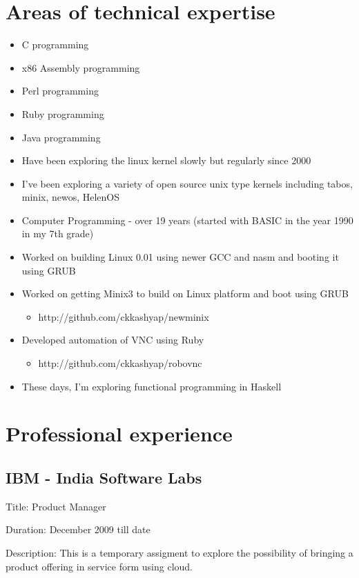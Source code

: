 \documentclass [a4paper,11pt] {article}
\begin{document}
\section*{Areas of technical expertise}
\begin{itemize}
	\item C programming
	\item x86 Assembly programming
	\item Perl programming
	\item Ruby programming
	\item Java programming
	\item Have been exploring the linux kernel slowly but regularly since 2000
	\item I’ve been exploring a variety of open source unix type kernels including tabos, minix, newos, HelenOS
	\item Computer Programming - over 19 years (started with BASIC in the year 1990 in my 7th grade)
	\item Worked on building Linux 0.01 using newer GCC and nasm and booting it using GRUB
	\item Worked on getting Minix3 to build on Linux platform and boot using GRUB
		\begin{itemize}
			\item http://github.com/ckkashyap/newminix
		\end{itemize}
	\item Developed automation of VNC using Ruby
		\begin{itemize}
			\item http://github.com/ckkashyap/robovnc
		\end{itemize}
	\item These days, I'm exploring functional programming in Haskell
\end{itemize}


\section*{Professional experience}


\subsection*{IBM - India Software Labs}
\begin{description}
\item{Title:} Product Manager
\item{Duration:} December 2009 till date
\item{Description:} This is a temporary assigment to explore the possibility of bringing a product offering in service form using cloud.
\end{description}
\end{document}
